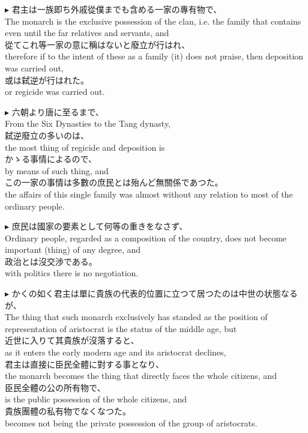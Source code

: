 \documentclass{ctexart}
\makeatletter
\newcommand*{\shifttext}[1]{%
  \settowidth{\@tempdima}{#1}%
  \hspace{-\@tempdima}#1%
}
\newcommand{\plabel}[1]{%
\shifttext{\textbf{#1}\quad}%
}
\newcommand{\prule}{%
\begin{center}%
\hdashrule[0.5ex]{.99\linewidth}{1pt}{1pt 2.5pt}%
\end{center}%
}
\makeatother
\begin{document}
\vspace{1em}
\plabel{$\blacktriangleright$}%
君主は一族即ち外戚從僕までも含める一家の專有物で、\\
The monarch is the exclusive possession of the clan, i.e. the family that contains even until the far relatives and servants, and\\
從てこれ等一家の意に稱はないと廢立が行はれ、\\
therefore if to the intent of these as a family (it) does not praise, then deposition was carried out,\\
或は弑逆が行はれた。\\
or regicide was carried out.

\vspace{1em}
\plabel{$\blacktriangleright$}%
六朝より唐に至るまで、\\
From the Six Dynasties to the Tang dynasty,\\
弑逆廢立の多いのは、\\
the most thing of regicide and deposition is\\
かゝる事情によるので、\\
by means of such thing, and\\
この一家の事情は多數の庶民とは殆んど無關係であつた。\\
the affairs of this single family was almost without any relation to most of the ordinary people.

\vspace{1em}
\plabel{$\blacktriangleright$}%
庶民は國家の要素として何等の重きをなさず、\\
Ordinary people, regarded as a composition of the country, does not become important (thing) of any degree, and \\
政治とは沒交渉である。\\
with politics there is no negotiation.

\prule

\vspace{1em}
\plabel{$\blacktriangleright$}%
かくの如く君主は單に貴族の代表的位置に立つて居つたのは中世の状態なるが、\\
The thing that such monarch exclusively has standed as the position of representation of aristocrat is the status of the middle age, but\\
近世に入りて其貴族が沒落すると、\\
as it enters the early modern age and its aristocrat declines,\\
君主は直接に臣民全體に對する事となり、\\
the monarch becomes the thing that directly faces the whole citizens, and\\
臣民全體の公の所有物で、\\
is the public possession of the whole citizens, and\\
貴族團體の私有物でなくなつた。\\
becomes not being the private possession of the group of aristocrats.
\end{document}
